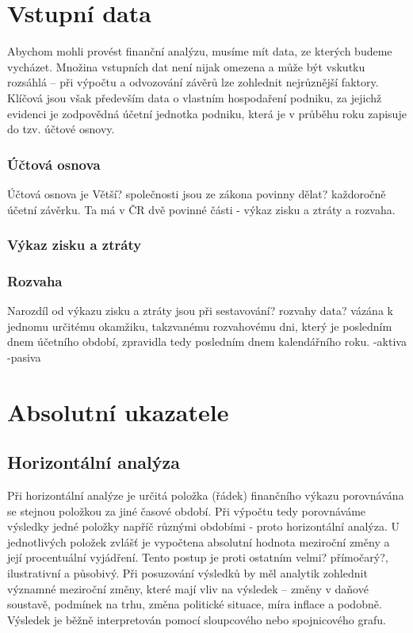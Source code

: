 \section{Vstupní data}
Abychom mohli provést finanční analýzu, musíme mít data, ze kterých budeme vycházet. Množina vstupních dat není nijak omezena a může být vskutku rozsáhlá -- při výpočtu a odvozování závěrů lze zohlednit nejrůznější faktory. Klíčová jsou však především data o vlastním hospodaření podniku, za jejichž evidenci je zodpovědná účetní jednotka podniku, která je v průběhu roku zapisuje do tzv. účtové osnovy.
\subsubsection{Účtová osnova}
Účtová osnova je 
Větší? společnosti jsou ze zákona povinny dělat? každoročně účetní závěrku. Ta má v ČR dvě povinné části - výkaz zisku a ztráty a rozvaha. 
\subsubsection{Výkaz zisku a ztráty}
\subsubsection{Rozvaha}
Narozdíl od výkazu zisku a ztráty jsou při sestavování? rozvahy data? vázána k jednomu určitému okamžiku, takzvanému rozvahovému dni, který je posledním dnem účetního období, zpravidla tedy posledním dnem kalendářního roku.
-aktiva
-pasiva

\section{Absolutní ukazatele}

\subsection{Horizontální analýza}
Při horizontální analýze je určitá položka (řádek) finančního výkazu porovnávána se stejnou položkou za jiné časové období. Při výpočtu tedy porovnáváme výsledky jedné položky napříč různými obdobími - proto horizontální analýza. U jednotlivých položek zvlášť je vypočtena absolutní hodnota meziroční změny a její procentuální vyjádření. Tento postup je proti ostatním velmi? přímočarý?, ilustrativní a působivý. Při posuzování výsledků by měl analytik zohlednit významné meziroční změny, které mají vliv na výsledek -- změny v daňové soustavě, podmínek na trhu, změna politické situace, míra inflace a podobně. Výsledek je běžně interpretován pomocí sloupcového nebo spojnicového grafu. 



